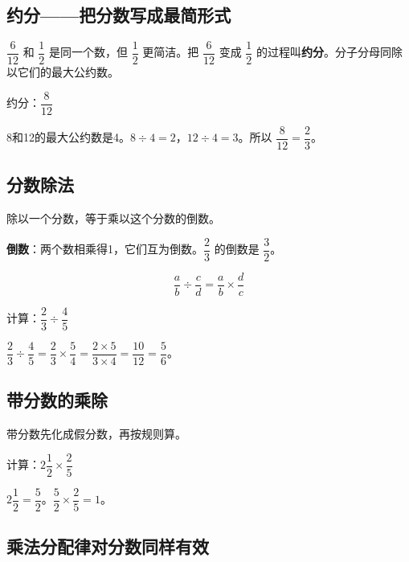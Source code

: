 \subsection*{约分——把分数写成最简形式}

$\dfrac{6}{12}$ 和 $\dfrac{1}{2}$ 是同一个数，但 $\dfrac{1}{2}$ 更简洁。把 $\dfrac{6}{12}$ 变成 $\dfrac{1}{2}$ 的过程叫\textbf{约分}。分子分母同除以它们的最大公约数。

\begin{example}
约分：$\dfrac{8}{12}$
\end{example}
\begin{solution}
8和12的最大公约数是4。$8\div4=2$，$12\div4=3$。所以 $\dfrac{8}{12} = \dfrac{2}{3}$。
\end{solution}

\subsection*{分数除法}

除以一个分数，等于乘以这个分数的倒数。

\textbf{倒数}：两个数相乘得1，它们互为倒数。$\dfrac{2}{3}$ 的倒数是 $\dfrac{3}{2}$。

\[
\frac{a}{b}\div\frac{c}{d} = \frac{a}{b}\times\frac{d}{c}
\]

\begin{example}
计算：$\dfrac{2}{3}\div\dfrac{4}{5}$
\end{example}
\begin{solution}
$\dfrac{2}{3}\div\dfrac{4}{5} = \dfrac{2}{3}\times\dfrac{5}{4} = \dfrac{2\times5}{3\times4} = \dfrac{10}{12} = \dfrac{5}{6}$。
\end{solution}

\subsection*{带分数的乘除}

带分数先化成假分数，再按规则算。

\begin{example}
计算：$2\dfrac{1}{2}\times\dfrac{2}{5}$
\end{example}
\begin{solution}
$2\dfrac{1}{2} = \dfrac{5}{2}$。$\dfrac{5}{2}\times\dfrac{2}{5} = 1$。
\end{solution}

\subsection*{乘法分配律对分数同样有效}

